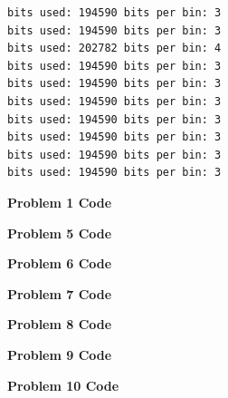 \documentclass[11pt]{article}
\begin{document}
\begin{verbatim}
bits used: 194590 bits per bin: 3
bits used: 194590 bits per bin: 3
bits used: 202782 bits per bin: 4
bits used: 194590 bits per bin: 3
bits used: 194590 bits per bin: 3
bits used: 194590 bits per bin: 3
bits used: 194590 bits per bin: 3
bits used: 194590 bits per bin: 3
bits used: 194590 bits per bin: 3
bits used: 194590 bits per bin: 3
\end{verbatim}

\pagebreak

\noindent \textbf{Problem 1 Code}


\pagebreak

\noindent \textbf{Problem 5 Code}


\pagebreak

\noindent \textbf{Problem 6 Code}


\pagebreak

\noindent \textbf{Problem 7 Code}


\pagebreak

\noindent \textbf{Problem 8 Code}


\pagebreak

\noindent \textbf{Problem 9 Code}


\pagebreak

\noindent \textbf{Problem 10 Code}

\end{document}
